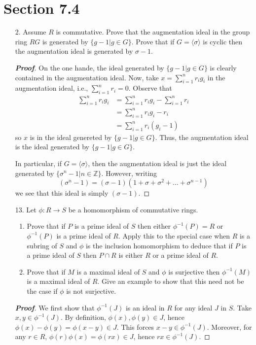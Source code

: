 \documentclass[12pt,leqno]{book}
\theoremstyle{definition}
\newcommand{\Z}{\mathbb{Z}}
\newenvironment{Proof}{\begin{proof}[\textnormal{\textbf{Proof}}]}{\end{proof}}
\begin{document}
\section*{Section 7.4}
\begin{enumerate}
 \item [2.] Assume $R$ is commutative. Prove that the augmentation ideal in the group ring $RG$ is generated by $\{g-1|g\in G\}$. Prove that if $G=\langle\sigma\rangle$ is cyclic then the augmentation ideal is generated by $\sigma-1$.

\begin{Proof}
 On the one hande, the ideal generated by $\{g-1|g\in G\}$ is clearly contained in the augmentation ideal. Now, take $x=\sum_{i=1}^nr_ig_i$ in the augmentation ideal, i.e., $\sum_{i=1}^nr_i=0$. Observe that \begin{align*}\sum_{i=1}^nr_ig_i&=\sum_{i=1}^nr_ig_i-\sum_{i=1}^nr_i\\&=\sum_{i=1}^nr_ig_i-r_i\\&=\sum_{i=1}^nr_i(g_i-1)\end{align*} so $x$ is in the ideal genereted by $\{g-1|g\in G\}$. Thus, the augmentation ideal is the ideal generated by $\{g-1|g\in G\}$.

In particular, if $G=\langle\sigma\rangle$, then the augmentation ideal is just the ideal generated by $\{\sigma^n-1|n\in\Z\}$. However, writing \[(\sigma^n-1)=(\sigma-1)(1+\sigma+\sigma^2+\hdots+\sigma^{n-1})\] we see that this ideal is simply $(\sigma-1)$.
\end{Proof}

 \item [13.] Let $\phi:R\to S$ be a homomorphism of commutative rings.
\begin{enumerate}
 \item Prove that if $P$ is a prime ideal of $S$ then either $\phi^{-1}(P)=R$ or $\phi^{-1}(P)$ is a prime ideal of $R$. Apply this to the special case when $R$ is a subring of $S$ and $\phi$ is the inclusion homomorphism to deduce that if $P$ is a prime ideal of $S$ then $P\cap R$ is either $R$ or a prime ideal of $R$.
 \item Prove that if $M$ is a maximal ideal of $S$ and $\phi$ is surjective then $\phi^{-1}(M)$ is a maximal ideal of $R$. Give an example to show that this need not be the case if $\phi$ is not surjective.
\end{enumerate}

\begin{Proof}We first show that $\phi^{-1}(J)$ is an ideal in $R$ for any ideal $J$ in $S$. Take $x,y\in\phi^{-1}(J)$. By definition, $\phi(x),\phi(y)\in J$, hence $\phi(x)-\phi(y)=\phi(x-y)\in J$. This forces $x-y\in\phi^{-1}(J)$. Moreover, for any $r\in R$, $\phi(r)\phi(x)=\phi(rx)\in J$, hence $rx\in\phi^{-1}(J)$. 


\end{Proof}
\end{enumerate}
\end{document}
